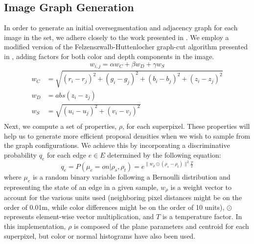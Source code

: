 \documentclass[10pt,letterpaper]{article}
\begin{document}
\subsection{Image Graph Generation}
	In order to generate an initial oversegmentation and adjacency graph for each image in the set, we adhere closely to the work presented in \cite{Erdogan12crv}. We employ a modified version of the Felzenszwalb-Huttenlocher graph-cut algorithm presented in \cite{felzenszwalb2004efficient}, adding factors for both color and depth components in the image.
\begin{equation}
w_{i,j}=\alpha w_C + \beta w_D + \gamma w_S
\end{equation}
\begin{align*}
w_C&=\sqrt{(r_i-r_j)^2+(g_i-g_j)^2+(b_i-b_j)^2+(z_i-z_j)^2} \\
w_D&=abs(z_i-z_j) \\
w_S&=\sqrt{(u_i-u_j)^2+(v_i-v_j)^2} \\
\end{align*}
	Next, we compute a set of properties, $\rho$, for each superpixel. These properties will help us to generate more efficient proposal densities when we wish to sample from the graph configurations. We achieve this by incorporating a discriminative probability $q_e$ for each edge $e\in{E}$ determined by the following equation:
\begin{equation}
	q_e=P(\mu_e=on|\rho_s,\rho_t)=e^{\|w_\rho\odot(\rho_s-\rho_t)\|^2\frac{T}{2}}
	\label{eq:edgeProb}
\end{equation}
where $\mu_e$ is a random binary variable following a Bernoulli distribution and representing the state of an edge in a given sample, $w_\rho$ is a weight vector to account for the various units used (neighboring pixel distances might be on the order of 0.01m, while color differences might be on the order of 10 units), $\odot$ represents element-wise vector multiplication, and $T$ is a temperature factor. In this implementation, $\rho$ is composed of the plane parameters and centroid for each superpixel, but color or normal histograms have also been used.
\end{document}
